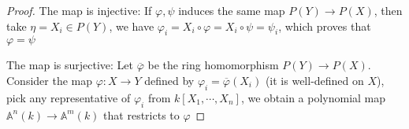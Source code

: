 \documentclass{solution}
\begin{document}
\begin{proof}
    The map is injective: If $\varphi, \psi$ induces the same map $P(Y) \rightarrow P(X)$, then take $\eta = X_i \in P(Y)$, we have $\varphi_i = X_i \circ \varphi = X_i \circ \psi = \psi_i$, which proves that $\varphi = \psi$

    The map is surjective: Let $\overline{\varphi}$ be the ring homomorphism $P(Y) \rightarrow P(X)$. Consider the map $\varphi: X \rightarrow Y$ defined by $\varphi_i = \overline{\varphi}(X_i)$ (it is well-defined on $X$), pick any representative of $\varphi_i$ from $k[X_1, \cdots, X_n]$, we obtain a polynomial map $\mathbb{A}^n(k) \rightarrow \mathbb{A}^m(k)$ that restricts to $\varphi$
\end{proof}
\end{document}

